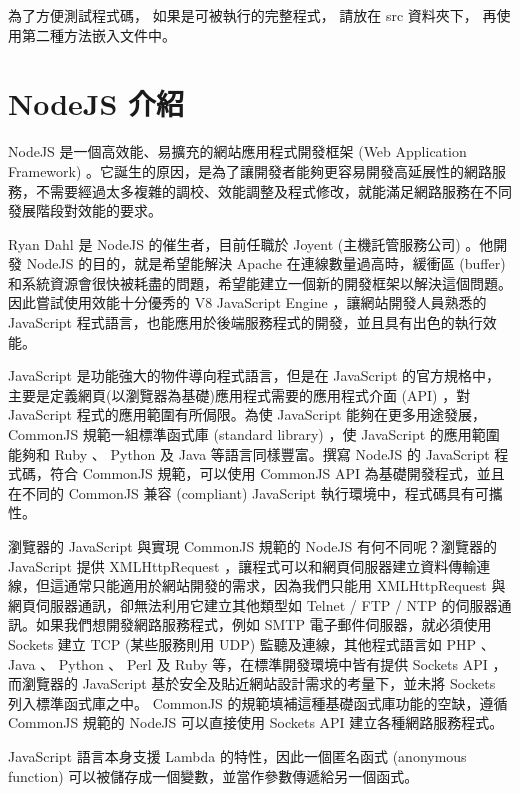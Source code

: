 \documentclass[a4paper,12pt,english]{sphinxmanual}
\begin{document}
為了方便測試程式碼，
如果是可被執行的完整程式，
請放在 src 資料夾下，
再使用第二種方法嵌入文件中。


\chapter{NodeJS 介紹}
\label{nodejs_intro::doc}\label{nodejs_intro:nodejs}
NodeJS 是一個高效能、易擴充的網站應用程式開發框架 (Web Application Framework) 。它誕生的原因，是為了讓開發者能夠更容易開發高延展性的網路服務，不需要經過太多複雜的調校、效能調整及程式修改，就能滿足網路服務在不同發展階段對效能的要求。

Ryan Dahl 是 NodeJS 的催生者，目前任職於 Joyent (主機託管服務公司) 。他開發 NodeJS 的目的，就是希望能解決 Apache 在連線數量過高時，緩衝區 (buffer) 和系統資源會很快被耗盡的問題，希望能建立一個新的開發框架以解決這個問題。因此嘗試使用效能十分優秀的 V8 JavaScript Engine ，讓網站開發人員熟悉的 JavaScript 程式語言，也能應用於後端服務程式的開發，並且具有出色的執行效能。

JavaScript 是功能強大的物件導向程式語言，但是在 JavaScript 的官方規格中，主要是定義網頁(以瀏覽器為基礎)應用程式需要的應用程式介面 (API) ，對 JavaScript 程式的應用範圍有所侷限。為使 JavaScript 能夠在更多用途發展， CommonJS 規範一組標準函式庫 (standard library) ，使 JavaScript 的應用範圍能夠和 Ruby 、 Python 及 Java 等語言同樣豐富。撰寫 NodeJS 的 JavaScript 程式碼，符合 CommonJS 規範，可以使用 CommonJS API 為基礎開發程式，並且在不同的 CommonJS 兼容 (compliant) JavaScript 執行環境中，程式碼具有可攜性。

瀏覽器的 JavaScript 與實現 CommonJS 規範的 NodeJS 有何不同呢？瀏覽器的 JavaScript 提供 XMLHttpRequest ，讓程式可以和網頁伺服器建立資料傳輸連線，但這通常只能適用於網站開發的需求，因為我們只能用 XMLHttpRequest 與網頁伺服器通訊，卻無法利用它建立其他類型如 Telnet / FTP / NTP 的伺服器通訊。如果我們想開發網路服務程式，例如 SMTP 電子郵件伺服器，就必須使用 Sockets 建立 TCP (某些服務則用 UDP) 監聽及連線，其他程式語言如 PHP 、 Java 、 Python 、 Perl 及 Ruby 等，在標準開發環境中皆有提供 Sockets API ，而瀏覽器的 JavaScript 基於安全及貼近網站設計需求的考量下，並未將 Sockets 列入標準函式庫之中。 CommonJS 的規範填補這種基礎函式庫功能的空缺，遵循 CommonJS 規範的 NodeJS 可以直接使用 Sockets API 建立各種網路服務程式。

JavaScript 語言本身支援 Lambda 的特性，因此一個匿名函式 (anonymous function) 可以被儲存成一個變數，並當作參數傳遞給另一個函式。
\end{document}
